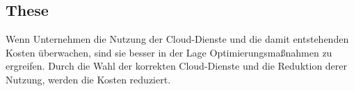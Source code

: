 \subsection{These}
Wenn Unternehmen die Nutzung der Cloud-Dienste und die damit entstehenden Kosten überwachen, sind sie besser in der Lage Optimierungsmaßnahmen zu ergreifen. Durch die Wahl der korrekten Cloud-Dienste und die Reduktion derer Nutzung, werden die Kosten reduziert. 

\begin{comment}
\subsection*{Einschränkungen}
\addcontentsline{toc}{subsection}{Einschränkungen}

Der Schwerpunkt dieser Arbeit liegt auf EC2-Instanzen, da diese in der Regel den größten Anteil an der Rechnung ausmachen.
An zweiter Stelle stehen S3-Speichereinheiten, weil sie einen erheblichen Teil der Kosten darstellen.

{\cite{AMZ08,AMZ09}} 
\\
Diese Arbeit legt den Fokus auf die Optimierung der oben genannten Dienste.
Als Überwachungswerkzeuge für die Kosten werden die AWS CloudWatch, der AWS Cost-Explorer und der AWS Trusted Advisor untersucht. 
\end{comment}
